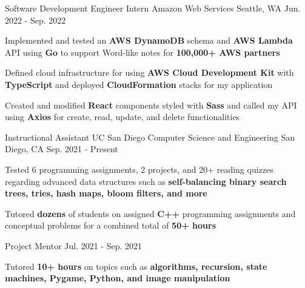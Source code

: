 

\begin{cventries}
  \cventry
    {Software Development Engineer Intern} %
    {Amazon Web Services} %
    {Seattle, WA} %
    {Jun. 2022 - Sep. 2022} %
    {
      \begin{cvitems} %
        \item {Implemented and tested an \textbf{AWS DynamoDB} schema and \textbf{AWS Lambda} API using \textbf{Go} to support Word-like notes for \textbf{100,000+ AWS partners} }
        \item {Defined cloud infrastructure for using \textbf{AWS Cloud Development Kit} with \textbf{TypeScript} and deployed \textbf{CloudFormation} stacks for my application}
        \item {Created and modified \textbf{React} components styled with \textbf{Sass} and called my API using \textbf{Axios} for create, read, update, and delete functionalities} 
      \end{cvitems}
    }


  \cvtwoentry
    {Instructional Assistant}
    {UC San Diego Computer Science and Engineering} %
    {San Diego, CA} %
    {Sep. 2021 - Present}
    {
      \begin{cvitems}
        \item {Tested 6 programming assignments, 2 projects, and 20+ reading quizzes regarding advanced data structures such as \textbf{self-balancing binary search trees, tries, hash maps, bloom filters, and more}}
        \item {Tutored \textbf{dozens} of students on assigned \textbf{C++} programming assignments and conceptual problems for a combined total of \textbf{50+ hours}}
      \end{cvitems}
    }
    {Project Mentor} %
    {Jul. 2021 - Sep. 2021} %
    {
      \begin{cvitems} %
        \item {Tutored \textbf{10+ hours} on topics such as \textbf{algorithms, recursion, state machines, Pygame, Python, and image manipulation}}
      \end{cvitems}
    }


\end{cventries}
